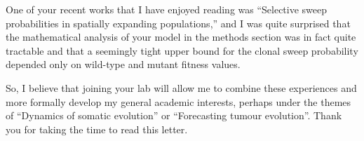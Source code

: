 \documentclass[letterpaper,11pt]{article}
\begin{document}
One of your recent works that I have enjoyed reading was ``Selective sweep probabilities in spatially expanding populations,'' and I was quite surprised that the mathematical analysis of your model in the methods section was in fact quite tractable and that a seemingly tight upper bound for the clonal sweep probability depended only on wild-type and mutant fitness values.

So, I believe that joining your lab will allow me to combine these experiences and more formally develop my general academic interests, perhaps under the themes of ``Dynamics of somatic evolution'' or ``Forecasting tumour evolution''.  Thank you for taking the time to read this letter.
\end{document}
